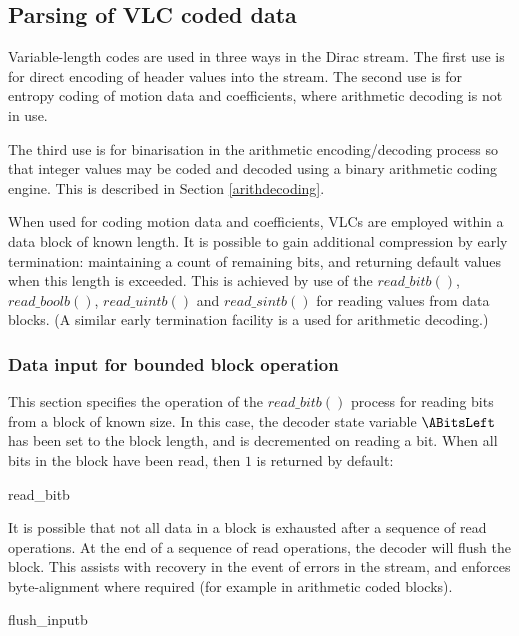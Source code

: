 \subsection{Parsing of VLC coded data}
\label{vlc}
Variable-length codes are used in three ways in the Dirac stream. The first
use is for direct encoding of header values into the stream. The second use
is for entropy coding of motion data and coefficients, where arithmetic decoding
is not in use.

The third use 
is for binarisation in the arithmetic encoding/decoding process so that integer 
values may be coded and decoded using a binary arithmetic coding engine. This is
described in Section \ref{arithdecoding}.

When used for coding motion data and coefficients, VLCs are employed within
a data block of known length. It is possible to gain additional compression by early termination:
maintaining a count of remaining bits, and returning default values when this length
is exceeded. This is achieved by use of the $read\_bitb()$, $read\_boolb()$, 
$read\_uintb()$ and $read\_sintb()$ for reading values from data blocks. 
(A similar early termination facility is a used for arithmetic decoding.)

\subsubsection{Data input for bounded block operation}
\label{blockreadbit}

This section specifies the operation of the $read\_bitb()$ process for reading bits from
a block of known size. In this case, the decoder state variable $\ABitsLeft$ has been
set to the block length, and is decremented on reading a bit. When all bits in the block
have been read, then $1$ is returned by default:

\begin{pseudo}{read\_bitb}{}
\bsELSE
\bsEND
\end{pseudo}

It is possible that not all data in a block is exhausted after a sequence of read operations.
At the end of a sequence of read operations, the decoder will flush the block. This assists
with recovery in the event of errors in the stream, and enforces byte-alignment where required 
(for example in arithmetic coded blocks).

\begin{pseudo}{flush\_inputb}{}
\bsEND
\end{pseudo}


